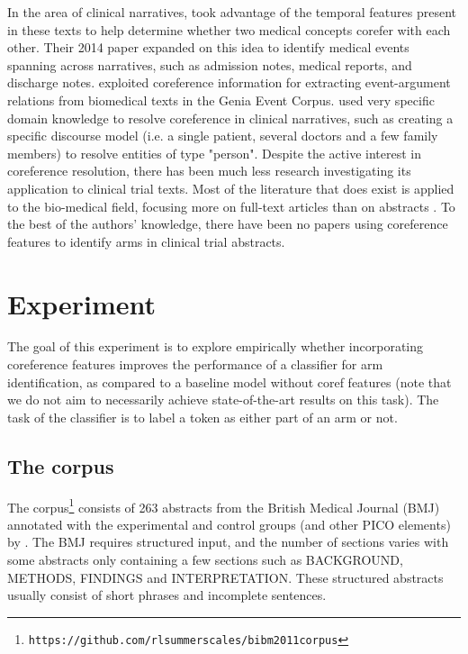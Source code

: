 In the area of clinical narratives,  took advantage of the temporal features present in these texts to help determine whether two medical concepts corefer with each other. Their 2014 paper \cite{Raghavan:2014} expanded on this idea to identify medical events spanning across narratives, such as admission notes, medical reports, and discharge notes.  exploited coreference information for extracting event-argument relations from biomedical texts in the Genia Event Corpus.  used very specific domain knowledge to resolve coreference in clinical narratives, such as creating a specific discourse model (i.e. a single patient, several doctors and a few family members) to resolve entities of type "person".  Despite the active interest in coreference resolution, there has been much less research investigating its application to clinical trial texts. Most of the literature that does exist is applied to the bio-medical field, focusing more on full-text articles \cite{Gasperin:2008,Huang:2010,Kilicoglu:2016} than on abstracts \cite{Castano:2002,Yang:2004}. To the best of the authors' knowledge, there have been no papers using coreference features to identify arms in clinical trial abstracts. 

\section{Experiment}

The goal of this experiment is to explore empirically whether incorporating coreference features improves the performance of a classifier for arm identification, as compared to a baseline model without coref features (note that we do not aim to necessarily achieve state-of-the-art results on this task). The task of the classifier is to label a token as either part of an arm or not.

\subsection{The corpus}

The corpus\footnote{\scriptsize {\tt https://github.com/rlsummerscales/bibm2011corpus}} consists of 263 abstracts from the British Medical Journal (BMJ) annotated with the experimental and control groups (and other PICO elements) by . The BMJ requires structured input, and the number of sections varies with some abstracts only containing a few sections such as BACKGROUND, METHODS, FINDINGS and INTERPRETATION. These structured abstracts usually consist of short phrases and incomplete sentences. 

